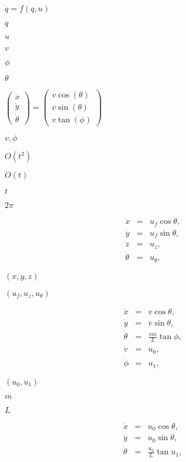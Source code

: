 \documentclass{article}
\begin{document}
$\dot{q} = f(q,u)$
\pagebreak

$q$
\pagebreak

$u$
\pagebreak

$v$
\pagebreak

$\phi$
\pagebreak

$\theta$
\pagebreak

$ \left( \begin{array}{c} \dot{x}\\ \dot{y}\\ \dot{\theta} \end{array} \right) = \left( \begin{array}{c} v \cos(\theta)\\ v \sin(\theta)\\ v \tan(\phi) \end{array} \right) $
\pagebreak

$v, \phi$
\pagebreak

$O(t^2)$
\pagebreak

$O(t)$
\pagebreak

$t$
\pagebreak

$2\pi$
\pagebreak

\begin{eqnarray*} \ddot x &=& u_f\cos\theta,\\ \ddot y &=& u_f\sin\theta,\\ \ddot z &=& u_z,\\ \ddot\theta &=& u_\theta,\end{eqnarray*}
\pagebreak

$(x,y,z)$
\pagebreak

$(u_f,u_z,u_\theta)$
\pagebreak

\begin{eqnarray*} \dot x &=& v\cos\theta,\\ \dot y &=& v\sin\theta,\\ \dot\theta &=& \frac{vm}{L}\tan \phi,\\ \dot v &=& u_0,\\ \dot\phi &=& u_1,\end{eqnarray*}
\pagebreak

$(u_0,u_1)$
\pagebreak

$m$
\pagebreak

$L$
\pagebreak

\begin{eqnarray*} \dot x &=& u_0 \cos\theta,\\ \dot y &=& u_0\sin\theta,\\ \dot\theta &=& \frac{u_0}{L}\tan u_1,\end{eqnarray*}
\pagebreak
\end{document}
